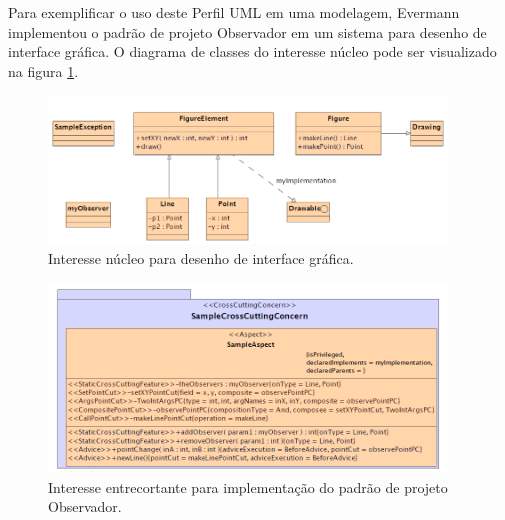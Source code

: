 Para exemplificar o uso deste Perfil UML em uma modelagem, Evermann implementou o padrão de projeto Observador \cite{Gamma:1995:DPE:186897} em um
sistema para desenho de interface gráfica. O diagrama de classes do interesse núcleo pode ser visualizado na figura \ref{fig:p21_base_model}. 

\begin{figure}
	\centering
	\includegraphics[width=400px]{img/p21_base_model.png}
	\caption{Interesse núcleo para desenho de interface
	gráfica.}\label{fig:p21_base_model}
\end{figure}

\begin{figure}
	\centering
	\includegraphics[width=400px]{img/p21_extension_model.png}
	\caption{Interesse entrecortante para implementação
	do padrão de projeto Observador.}\label{fig:p21_extension_model}
\end{figure}

